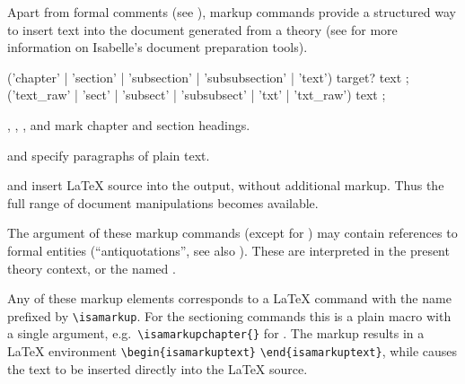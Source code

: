 \begin{isabellebody}
\begin{isamarkuptext}
  Apart from formal comments (see ), markup
  commands provide a structured way to insert text into the document
  generated from a theory (see \cite{isabelle-sys} for more
  information on Isabelle's document preparation tools).

  \begin{rail}
    ('chapter' | 'section' | 'subsection' | 'subsubsection' | 'text') target? text
    ;
    ('text\_raw' | 'sect' | 'subsect' | 'subsubsect' | 'txt' | 'txt\_raw') text
    ;
  \end{rail}

  \begin{descr}

  \item [\hyperlink{command.chapter}{\mbox{\isa{\isacommand{chapter}}}}, \hyperlink{command.section}{\mbox{\isa{\isacommand{section}}}}, \hyperlink{command.subsection}{\mbox{\isa{\isacommand{subsection}}}}, and \hyperlink{command.subsubsection}{\mbox{\isa{\isacommand{subsubsection}}}}] mark chapter and
  section headings.

  \item [\hyperlink{command.text}{\mbox{\isa{\isacommand{text}}}} and \hyperlink{command.txt}{\mbox{\isa{\isacommand{txt}}}}] specify paragraphs of
  plain text.

  \item [\hyperlink{command.text-raw}{\mbox{\isa{\isacommand{text{\isacharunderscore}raw}}}} and \hyperlink{command.txt-raw}{\mbox{\isa{\isacommand{txt{\isacharunderscore}raw}}}}] insert
  {\LaTeX} source into the output, without additional markup.  Thus
  the full range of document manipulations becomes available.

  \end{descr}

  The  argument of these markup commands (except for
  \hyperlink{command.text-raw}{\mbox{}}) may contain references to formal entities
  (``antiquotations'', see also ).  These are
  interpreted in the present theory context, or the named .

  Any of these markup elements corresponds to a {\LaTeX} command with
  the name prefixed by \verb|\isamarkup|.  For the sectioning
  commands this is a plain macro with a single argument, e.g.\
  \verb|\isamarkupchapter{|\isa{{\isachardoublequote}{\isasymdots}{\isachardoublequote}}\verb|}| for
  \hyperlink{command.chapter}{\mbox{\isa{\isacommand{chapter}}}}.  The \hyperlink{command.text}{\mbox{}} markup results in a
  {\LaTeX} environment \verb|\begin{isamarkuptext}| \isa{{\isachardoublequote}{\isasymdots}{\isachardoublequote}} \verb|\end{isamarkuptext}|, while \hyperlink{command.text-raw}{\mbox{}}
  causes the text to be inserted directly into the {\LaTeX} source.


\end{isamarkuptext}
\end{isabellebody}
